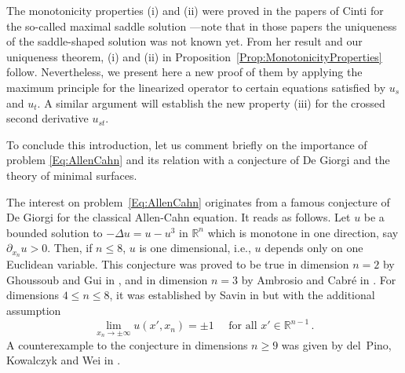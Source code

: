 \documentclass[12pt,reqno]{amsart}
\theoremstyle{definition}
\theoremstyle{remark}
\newcommand{\con}[1]{\mathbb{#1}}
\newcommand{\R}{\con{R}} %
\numberwithin{equation}{section}
\begin{document}
The monotonicity properties (i) and (ii) were proved in the papers of Cinti \cite{Cinti-Saddle,Cinti-Saddle2} for the so-called maximal saddle solution ---note that in those papers the uniqueness of the saddle-shaped solution was not known yet. From her result and our uniqueness theorem, (i) and (ii) in Proposition~\ref{Prop:MonotonicityProperties} follow. Nevertheless, we present here a new proof of them by applying the maximum principle for the linearized operator to certain equations satisfied by $u_s$ and $u_t$. A similar argument will establish the new property (iii) for the crossed second derivative $u_{st}$. 

To conclude this introduction, let us comment briefly on the importance of problem \eqref{Eq:AllenCahn} and its relation with a conjecture of De Giorgi and the theory of minimal surfaces.

The interest on problem~\eqref{Eq:AllenCahn} originates from a famous conjecture of De Giorgi for the classical Allen-Cahn equation. It reads as follows. Let $u$ be a bounded solution to $-\Delta  u = u - u^3 $ in $\R^n$ which is monotone in one direction, say $\partial_{x_n} u > 0$. Then, if $n\leq 8$, $u$ is one dimensional, i.e., $u$ depends only on one Euclidean variable. This conjecture was proved to be true in dimension $n=2$ by Ghoussoub and Gui in \cite{GhoussoubGui}, and in dimension $n=3$ by Ambrosio and Cabré in \cite{AmbrosioCabre}. For dimensions $4\leq n \leq 8$, it was established by Savin in \cite{Savin-DeGiorgi} but with the additional assumption 
\begin{equation}
\label{Eq:SavinCondition}
	\lim_{x_n \to \pm \infty} u(x',x_n) = \pm 1 \quad \text{ for all } x'\in \R^{n-1}\,.
\end{equation}
A counterexample to the conjecture in dimensions $n \geq 9$ was given by del~Pino, Kowalczyk and Wei in \cite{delPinoKowalczykWei}. 
\end{document}
